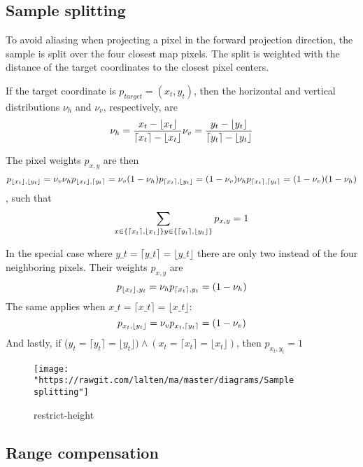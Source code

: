 \subsection{Sample splitting}\label{sample-splitting}

To avoid aliasing when projecting a pixel in the forward projection
direction, the sample is split over the four closest map pixels. The
split is weighted with the distance of the target coordinates to the
closest pixel centers.

If the target coordinate is \(p_{target}=(x_t, y_t)\), then the
horizontal and vertical distributions \(\nu_h\) and \(\nu_v\),
respectively, are \[
\nu_h = \frac{x_t - \lfloor x_t \rfloor}{\lceil x_t \rceil - \lfloor x_t \rfloor} \\
\nu_v = \frac{y_t - \lfloor y_t \rfloor}{\lceil y_t \rceil - \lfloor y_t \rfloor}
\]

The pixel weights \(p_{x,y}\) are then \[
p_{\lfloor x_t \rfloor, \lfloor y_t \rfloor} = \nu_v \nu_h\\
p_{\lfloor x_t \rfloor, \lceil y_t \rceil} = \nu_v (1 - \nu_h)\\
p_{\lceil x_t \rceil, \lfloor y_t \rfloor} =  (1 - \nu_v) \nu_h\\
p_{\lceil x_t \rceil, \lceil y_t \rceil} = (1 - \nu_v) (1 - \nu_h)
\] , such that \[
\sum\limits_{
x \in \{\lceil x_t \rceil, \lfloor x_t \rfloor\}\\
y \in \{\lceil y_t \rceil, \lfloor y_t \rfloor\}
} p_{x,y} = 1
\]

In the special case where $y\_t = \lceil y\_t \rceil = \lfloor y\_t\rfloor$ there are only two instead of the four neighboring pixels. Their weights \(p_{x,y}\) are \[
p_{\lfloor x_t \rfloor, y_t} = \nu_h\\
p_{\lceil x_t \rceil, y_t} = (1 - \nu_h)
\] The same applies when $x\_t = \lceil x\_t \rceil = \lfloor x\_t\rfloor$: \[
p_{x_t, \lfloor y_t \rfloor} = \nu_v\\
p_{x_t, \lceil y_t \rceil} = (1 - \nu_v)
\] And lastly, if
(\(y_t = \lceil y_t \rceil = \lfloor y_t \rfloor ) \land (x_t = \lceil x_t \rceil = \lfloor x_t \rfloor )\),
then \(p_{x_t, y_t} = 1\)

\begin{figure}
\centering
\texttt{[image: "https://rawgit.com/lalten/ma/master/diagrams/Sample splitting"]}
\caption{restrict-height}
\end{figure}

\subsection{Range compensation}\label{range-compensation}

